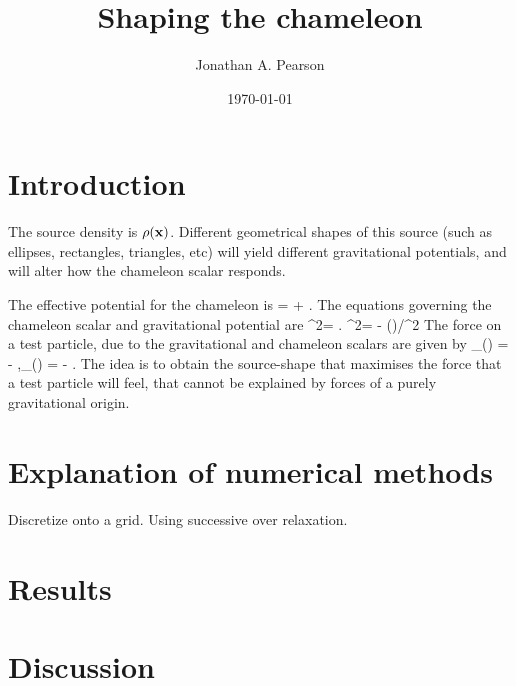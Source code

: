 \documentclass[amsmath,amssymb,10pt,eqsecnum, twocolumn]{revtex4}
\begin{document}
\title{Shaping the chameleon}
\author{Jonathan A. Pearson}
\date{\today}

\maketitle




 
 
 
\section{Introduction}

The source density is $\rho({\bf{x}})$.  Different geometrical shapes of this source (such as ellipses, rectangles, triangles, etc) will yield different gravitational potentials, and will alter how the chameleon scalar responds.

The effective potential for the chameleon is
\bea
{} =  + \phi.
\eea
The equations governing the chameleon scalar and gravitational potential are
\bse
\bea
\nabla^2\phi = .
\eea
\bea
\nabla^2\Phi = - \rho()/^2
\eea
\ese
The force on a test particle, due to the gravitational and chameleon scalars are given by
\bea
{}_{(\phi)} = - \nabla\phi,\qquad {}_{(\Phi)} = - \nabla\Phi.
\eea
The idea is to obtain the source-shape that maximises the force that a test particle will feel, that cannot be explained by forces of a purely gravitational origin.


\section{Explanation of numerical methods}
Discretize onto a grid. Using successive over relaxation.
\section{Results}

\section{Discussion}
\end{document}
